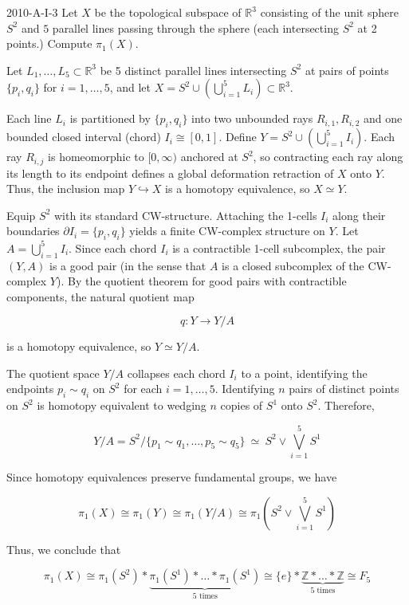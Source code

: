 \documentclass{article}
\begin{document}
	\begin{prb}{2010-A-I-3}
		Let $X$ be the topological subspace of $\mathbb{R}^3$ consisting of the unit sphere $S^2$ and $5$ parallel lines passing through the sphere (each intersecting $S^2$ at 2 points.) Compute $\pi_1(X)$. 
	\end{prb}
	Let $L_1, \dots, L_5 \subset \mathbb{R}^3$ be 5 distinct parallel lines intersecting $S^2$ at pairs of points $\{p_i, q_i\}$ for $i = 1, \dots, 5$, and let $X = S^2 \cup \left(\bigcup_{i=1}^5 L_i\right) \subset \mathbb{R}^3$.
	
	Each line $L_i$ is partitioned by $\{p_i, q_i\}$ into two unbounded rays $R_{i,1}, R_{i,2}$ and one bounded closed interval (chord) $I_i \cong [0, 1]$. Define $Y = S^2 \cup \left(\bigcup_{i=1}^5 I_i\right)$. Each ray $R_{i,j}$ is homeomorphic to $[0, \infty)$ anchored at $S^2$, so contracting each ray along its length to its endpoint defines a global deformation retraction of $X$ onto $Y$. Thus, the inclusion map $Y \hookrightarrow X$ is a homotopy equivalence, so $X \simeq Y$.
	
	Equip $S^2$ with its standard CW-structure. Attaching the 1-cells $I_i$ along their boundaries $\partial I_i = \{p_i, q_i\}$ yields a finite CW-complex structure on $Y$. Let $A = \bigcup_{i=1}^5 I_i$. Since each chord $I_i$ is a contractible 1-cell subcomplex, the pair $(Y, A)$ is a good pair (in the sense that $A$ is a closed subcomplex of the CW-complex $Y$). By the quotient theorem for good pairs with contractible components, the natural quotient map
	
	$$q: Y \longrightarrow Y / A$$
	
	is a homotopy equivalence, so $Y \simeq Y / A$.
	
	The quotient space $Y / A$ collapses each chord $I_i$ to a point, identifying the endpoints $p_i \sim q_i$ on $S^2$ for each $i = 1, \dots, 5$. Identifying $n$ pairs of distinct points on $S^2$ is homotopy equivalent to wedging $n$ copies of $S^1$ onto $S^2$. Therefore,
	
	$$Y / A = S^2 / \{p_1 \sim q_1, \dots, p_5 \sim q_5\} \ \simeq \ S^2 \vee \bigvee_{i=1}^5 S^1$$
	
	Since homotopy equivalences preserve fundamental groups, we have
	
	$$\pi_1(X) \cong \pi_1(Y) \cong \pi_1(Y / A) \cong \pi_1\left(S^2 \vee \bigvee_{i=1}^5 S^1\right)$$
	
	Thus, we conclude that
	
	$$\pi_1(X) \cong \pi_1(S^2) * \underbrace{\pi_1(S^1) * \dots * \pi_1(S^1)}_{5 \text{ times}} \cong \{e\} * \underbrace{\mathbb{Z} * \dots * \mathbb{Z}}_{5 \text{ times}} \cong F_5$$
	
\end{document}
